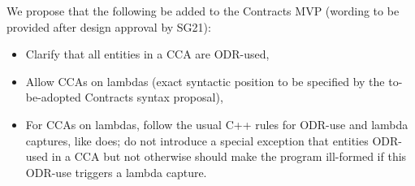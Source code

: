 We propose that the following be added to the Contracts MVP (wording to be provided after design approval by SG21):

\begin{itemize}
\item Clarify that all entities in a CCA are ODR-used,
\item Allow CCAs on lambdas (exact syntactic position to be specified by the to-be-adopted Contracts syntax proposal),
\item For CCAs on lambdas, follow the usual C++ rules for ODR-use and lambda captures, like \tcode{[[assume]]} does; do not introduce a special exception that entities ODR-used in a CCA but not otherwise should make the program ill-formed if this ODR-use triggers a lambda capture.
\end{itemize}





\renewcommand{\bibname}{References}




